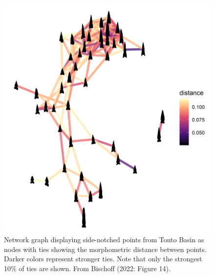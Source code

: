 \documentclass[]{interact}
\theoremstyle{plain}%
\theoremstyle{definition}
\theoremstyle{remark}
\begin{document}
\begin{figure}
\includegraphics[width=1\linewidth]{figures/TontoSideDistanceNetwork} \caption{Network graph displaying side-notched points from Tonto Basin as nodes with ties showing the morphometric distance between points. Darker colors represent stronger ties. Note that only the strongest 10\% of ties are shown. From Bischoff (2022: Figure 14).}\label{fig:TontoSideDistanceNetwork}
\end{figure}
\end{document}
